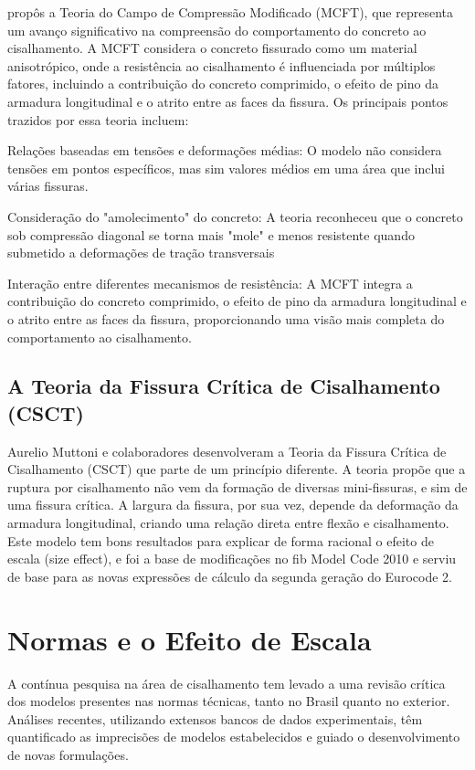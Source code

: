 \textcite{Vecchio1986} propôs a Teoria do Campo de Compressão Modificado (MCFT), que representa um avanço significativo na compreensão do comportamento do concreto ao cisalhamento. A MCFT considera o concreto fissurado como um material anisotrópico, onde a resistência ao cisalhamento é influenciada por múltiplos fatores, incluindo a contribuição do concreto comprimido, o efeito de pino da armadura longitudinal e o atrito entre as faces da fissura. Os principais pontos trazidos por essa teoria incluem:

\begin{alineas}
    \item Relações baseadas em tensões e deformações médias: O modelo não considera tensões em pontos específicos, mas sim valores médios em uma área que inclui várias fissuras.
    \item Consideração do "amolecimento" do concreto: A teoria reconheceu que o concreto sob compressão diagonal se torna mais "mole" e menos resistente quando submetido a deformações de tração transversais
    \item  Interação entre diferentes mecanismos de resistência: A MCFT integra a contribuição do concreto comprimido, o efeito de pino da armadura longitudinal e o atrito entre as faces da fissura, proporcionando uma visão mais completa do comportamento ao cisalhamento.
\end{alineas}

\subsection{A Teoria da Fissura Crítica de Cisalhamento (CSCT)}

Aurelio Muttoni e colaboradores desenvolveram a Teoria da Fissura Crítica de Cisalhamento (CSCT) que parte de um princípio diferente. A teoria propõe que a ruptura por cisalhamento não vem da formação de diversas mini-fissuras, e sim de uma fissura crítica. A largura da fissura, por sua vez, depende da deformação da armadura longitudinal, criando uma relação direta entre flexão e cisalhamento. Este modelo tem bons resultados para explicar de forma racional o efeito de escala (size effect), e foi a base de modificações no fib Model Code 2010 e serviu de base para as novas expressões de cálculo da segunda geração do Eurocode 2.

\section{Normas e o Efeito de Escala}
A contínua pesquisa na área de cisalhamento tem levado a uma revisão crítica dos modelos presentes nas normas técnicas, tanto no Brasil quanto no exterior. Análises recentes, utilizando extensos bancos de dados experimentais, têm quantificado as imprecisões de modelos estabelecidos e guiado o desenvolvimento de novas formulações.

